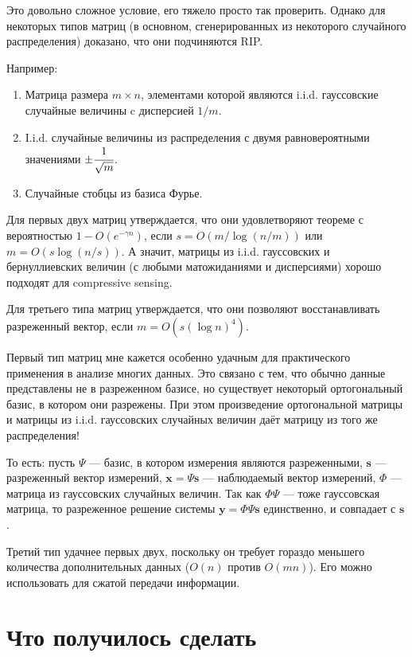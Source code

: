 \documentclass{article}
\def\*#1{\mathbf{#1}}
\begin{document}
Это довольно сложное условие, его тяжело просто так проверить. Однако для некоторых типов матриц (в основном, сгенерированных из некоторого случайного распределения) доказано, что они подчиняются RIP.

Например:

\begin{enumerate}
	\item Матрица размера $m \times n$, элементами которой являются i.i.d. гауссовские случайные величины c дисперсией $1/m$.
	\item I.i.d. случайные величины из распределения с двумя равновероятными значениями $\pm \cfrac{1}{\sqrt{m}}$.
	\item Случайные стобцы из базиса Фурье.
\end{enumerate}

Для первых двух матриц утверждается, что они удовлетворяют теореме с вероятностью $1 - O(e^{-\gamma n})$, если $s = O(m / \log(n/m))$ или $m = O(s \log(n/s))$. А значит, матрицы из i.i.d. гауссовских и бернуллиевских величин (с любыми матожиданиями и дисперсиями) хорошо подходят для compressive sensing.

Для третьего типа матриц утверждается, что они позволяют восстанавливать разреженный вектор, если $m = O(s (\log n)^4)$.

Первый тип матриц мне кажется особенно удачным для практического применения в анализе многих данных. Это связано с тем, что обычно данные представлены не в разреженном базисе, но существует некоторый ортогональный базис, в котором они разрежены. При этом произведение ортогональной матрицы и матрицы из i.i.d. гауссовских случайных величин даёт матрицу из того же распределения!

То есть: пусть $\Psi$ --- базис, в котором измерения являются разреженными, $\*s$ --- разреженный вектор измерений, $\*x = \Psi \*s$ --- наблюдаемый вектор измерений, $\Phi$ --- матрица из гауссовских случайных величин. Так как $\Phi \Psi$ --- тоже гауссовская матрица, то разреженное решение системы $\*y = \Phi \Psi \*s$ единственно, и совпадает с $\*s$.

Третий тип удачнее первых двух, поскольку он требует гораздо меньшего количества дополнительных данных ($O(n)$ против $O(mn)$). Его можно использовать для сжатой передачи информации.

\section{Что получилось сделать}
\end{document}
